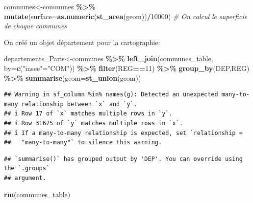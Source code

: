\documentclass[
]{book}
\newenvironment{Shaded}{\begin{snugshade}}{\end{snugshade}}
\newcommand{\AttributeTok}[1]{\textcolor[rgb]{0.13,0.29,0.53}{#1}}
\newcommand{\CommentTok}[1]{\textcolor[rgb]{0.56,0.35,0.01}{\textit{#1}}}
\newcommand{\DecValTok}[1]{\textcolor[rgb]{0.00,0.00,0.81}{#1}}
\newcommand{\FunctionTok}[1]{\textcolor[rgb]{0.13,0.29,0.53}{\textbf{#1}}}
\newcommand{\NormalTok}[1]{#1}
\newcommand{\OtherTok}[1]{\textcolor[rgb]{0.56,0.35,0.01}{#1}}
\newcommand{\SpecialCharTok}[1]{\textcolor[rgb]{0.81,0.36,0.00}{\textbf{#1}}}
\newcommand{\StringTok}[1]{\textcolor[rgb]{0.31,0.60,0.02}{#1}}
\begin{document}
\begin{Shaded}
\begin{Highlighting}[]
\NormalTok{communes}\OtherTok{\textless{}{-}}\NormalTok{communes }\SpecialCharTok{\%\textgreater{}\%}
  \FunctionTok{mutate}\NormalTok{(}\AttributeTok{surface=}\FunctionTok{as.numeric}\NormalTok{(}\FunctionTok{st\_area}\NormalTok{(geom))}\SpecialCharTok{/}\DecValTok{10000}\NormalTok{) }\CommentTok{\# On calcul le superficie de chaque communes}
\end{Highlighting}
\end{Shaded}

On créé un objet département pour la cartographie:

\begin{Shaded}
\begin{Highlighting}[]
\NormalTok{departements\_Paris}\OtherTok{\textless{}{-}}\NormalTok{communes }\SpecialCharTok{\%\textgreater{}\%}
  \FunctionTok{left\_join}\NormalTok{(communes\_table, }\AttributeTok{by=}\FunctionTok{c}\NormalTok{(}\StringTok{"insee"}\OtherTok{=}\StringTok{"COM"}\NormalTok{)) }\SpecialCharTok{\%\textgreater{}\%}
  \FunctionTok{filter}\NormalTok{(REG}\SpecialCharTok{==}\DecValTok{11}\NormalTok{) }\SpecialCharTok{\%\textgreater{}\%}
  \FunctionTok{group\_by}\NormalTok{(DEP,REG) }\SpecialCharTok{\%\textgreater{}\%}
  \FunctionTok{summarise}\NormalTok{(}\AttributeTok{geom=}\FunctionTok{st\_union}\NormalTok{(geom))}
\end{Highlighting}
\end{Shaded}

\begin{verbatim}
## Warning in sf_column %in% names(g): Detected an unexpected many-to-many relationship between `x` and `y`.
## i Row 17 of `x` matches multiple rows in `y`.
## i Row 31675 of `y` matches multiple rows in `x`.
## i If a many-to-many relationship is expected, set `relationship =
##   "many-to-many"` to silence this warning.
\end{verbatim}

\begin{verbatim}
## `summarise()` has grouped output by 'DEP'. You can override using the `.groups`
## argument.
\end{verbatim}

\begin{Shaded}
\begin{Highlighting}[]
\FunctionTok{rm}\NormalTok{(communes\_table)}
\end{Highlighting}
\end{Shaded}
\end{document}
